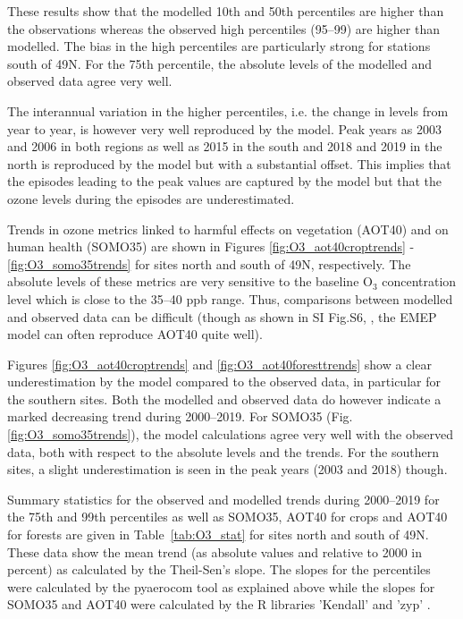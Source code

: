 These results show that the modelled 10th and 50th percentiles are higher than the observations whereas the observed high percentiles (95--99) are higher than modelled. The bias in the high percentiles are particularly strong for stations south of 49\degrees N. For the 75th percentile, the absolute levels of the modelled and observed data agree very well. 

The interannual variation in the higher percentiles, i.e. the change in levels from year to year, is however very well reproduced by the model. Peak years as 2003 and 2006 in both regions as well as 2015 in the south and 2018 and 2019 in the north is reproduced by the model but with a substantial offset. This implies that the episodes leading to the peak values are captured by the model but that the ozone levels during the episodes are underestimated. 

Trends in ozone metrics linked to harmful effects on vegetation (AOT40) and on human health (SOMO35) are shown in Figures \ref{fig:O3_aot40croptrends} - \ref{fig:O3_somo35trends} for sites north and south of 49\degrees N, respectively. The absolute levels of these metrics are very sensitive to the baseline O$_3$ concentration level \citep{SofievTuovinen} which is close to the 35--40 ppb range. Thus, comparisons between modelled and observed data can be difficult (though as shown in SI Fig.S6, \citealt{Etzold:2020}, the EMEP model can often reproduce AOT40 quite well). 

Figures \ref{fig:O3_aot40croptrends} and \ref{fig:O3_aot40foresttrends} show a clear underestimation by the model compared to the observed data, in particular for the southern sites. Both the modelled and observed data do however indicate a marked decreasing trend during 2000--2019. For SOMO35 (Fig.\ref{fig:O3_somo35trends}), the model calculations agree very well with the observed data, both with respect to the absolute levels and the trends. For the southern sites, a slight underestimation is seen in the peak years (2003 and 2018) though. 

Summary statistics for the observed and modelled trends during 2000--2019 for the 75th and 99th percentiles as well as SOMO35, AOT40 for crops and AOT40 for forests are given in Table~\ref{tab:O3_stat} for sites north and south of 49\degrees N. These data show the mean trend (as absolute values and relative to 2000 in percent) as calculated by the Theil-Sen's slope. The slopes for the percentiles were calculated by the pyaerocom tool as explained above while the slopes for SOMO35 and AOT40 were calculated by the R libraries 'Kendall' \citep{McLeod_2011} and 'zyp' \citep{Bronaugh_Werner_2019}. 

